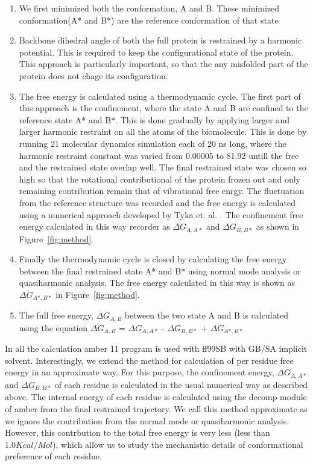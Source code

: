\documentclass[12pt]{article}
\begin{document}
\begin{enumerate}

\item  We first minimized both the conformation, A and B. These minimized conformation(A* and B*) 
       are the reference conformation of that state

\item Backbone dihedral angle of both the full protein is restrained by a harmonic potential. This is required to keep
    the configurational state of the protein. This approach is particularly important, so that the any misfolded part 
    of the protein does not chage its configuration. 

\item  The free energy is calculated using a thermodynamic cycle. The first part of this approach is the confinement, where
       the state A and B are confined to the reference state A* and B*. This is done gradually by applying larger and larger
       harmonic restraint on all the atoms of the biomolecule. This is done by running 21 molecular dynamics simulation 
       each of 20 ns long, where the harmonic restraint constant was varied from 0.00005 to 81.92 untill the free and the 
       restrained state overlap well. The final restrained state was chosen so high so that the rotational contributional 
       of the protein frozen out and only remaining contribution remain that of vibrational free enrgy. The fluctuation from
       the reference structure was recorded and the free energy is calculated using a numerical
       approach developed by Tyka et. al. \cite{Tyka2006}. The confinement free energy calculated in this way recorder as 
       $\Delta G_{A,A*}$ and $\Delta G_{B,B*}$ as shown in Figure~\ref{fig:method}.     

\item  Finally the thermodynamic cycle is closed by calculating the free energy between the final
       restrained state A* and B* using normal mode analysis or quasiharmonic analysis. The free energy calculated in 
       this way is shown as $\Delta G_{A*,B*}$ in Figure~\ref{fig:method}.

\item  The full free energy, $\Delta G_{A,B}$ between the two state A and B is calculated using the equation 
       $\Delta G_{A,B}$ = $\Delta G_{A,A*}$ - $\Delta G_{B,B*}$ + $\Delta G_{A*,B*}$  

\end{enumerate}

In all the calculation amber 11 program is used with ff99SB with GB/SA implicit solvent. Interestingly, we extend the
method for calculation of per residue free energy in an approximate way. For this purpose, the confinement energy, 
$\Delta G_{A,A*}$ and $\Delta G_{B,B*}$ of each residue is calculated in the usual numerical way as described above. The
internal energy of each residue is calculated using the decomp module of amber from the final restrained trajectory. We 
call this method approximate as we ignore the contribution from the normal mode or quasiharmonic analysis. 
However, this contrbution to the total free energy is very less (less than $1.0 Kcal/Mol$), which allow us to 
study the mechanistic details of conformational preference of each residue.      
\end{document}

